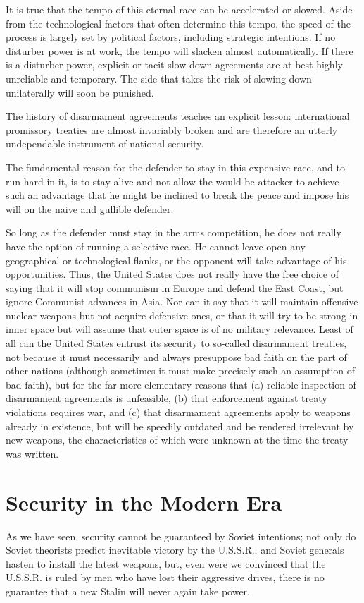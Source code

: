 It is true that the tempo of this eternal race can be accelerated or slowed. Aside from the technological factors that often determine this tempo, the speed of the process is largely set by political factors, including strategic intentions. If no disturber power is at work, the tempo will slacken almost automatically. If there is a disturber power, explicit or tacit slow-down agreements are at best highly unreliable and temporary. The side that takes the risk of slowing down unilaterally will soon be punished.

The history of disarmament agreements teaches an explicit lesson: international promissory treaties are almost invariably broken and are therefore an utterly undependable instrument of national security.

The fundamental reason for the defender to stay in this expensive race, and to run hard in it, is to stay alive and not allow the would-be attacker to achieve such an advantage that he might be inclined to break the peace and impose his will on the naive and gullible defender.

So long as the defender must stay in the arms competition, he does not really have the option of running a selective race. He cannot leave open any geographical or technological flanks, or the opponent will take advantage of his opportunities. Thus, the United States does not really have the free choice of saying that it will stop communism in Europe and defend the East Coast, but ignore Communist advances in Asia. Nor can it say that it will maintain offensive nuclear weapons but not acquire defensive ones, or that it will try to be strong in inner space but will assume that outer space is of no military relevance. Least of all can the United States entrust its security to so-called disarmament treaties, not because it must necessarily and always presuppose bad faith on the part of other nations (although sometimes it must make precisely such an assumption of bad faith), but for the far more elementary reasons that (a) reliable inspection of disarmament agreements is unfeasible, (b) that enforcement against treaty violations requires war, and (c) that disarmament agreements apply to weapons already in existence, but will be speedily outdated and be rendered irrelevant by new weapons, the characteristics of which were unknown at the time the treaty was written.

\section{Security in the Modern Era}
As we have seen, security cannot be guaranteed by Soviet intentions; not only do Soviet theorists predict inevitable victory by the U.S.S.R., and Soviet generals hasten to install the latest weapons, but, even were we convinced that the U.S.S.R. is ruled by men who have lost their aggressive drives, there is no guarantee that a new Stalin will never again take power.

